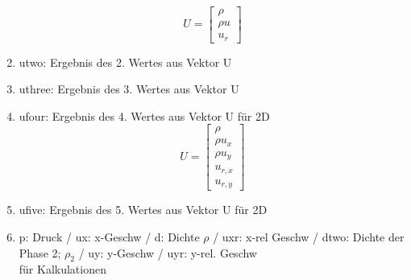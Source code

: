 \documentclass[12pt]{article}
\begin{document}
\begin{enumerate}
	\[
	U =  \left[\begin{array}{c}\rho \\ \rho u \\ u_r\end{array}\right]
	\]
	\item utwo: Ergebnis des 2. Wertes aus Vektor U
	\item uthree: Ergebnis des 3. Wertes aus Vektor U
	\item ufour: Ergebnis des 4. Wertes aus Vektor U für 2D\\
	\[
	U = \left[\begin{array}{c}\rho \\ \rho u_x \\ \rho u_y \\ u_{r,x}
	\\ u_{r,y} \end{array}\right]
	\]
	\item ufive: Ergebnis des 5. Wertes aus Vektor U für 2D
	\item p: Druck / ux: x-Geschw / d: Dichte $\rho$ / uxr: x-rel Geschw / dtwo: Dichte der Phase 2; $\rho_2$ / uy: y-Geschw / uyr: y-rel. Geschw\\
	für Kalkulationen
\end{enumerate}
\end{document}
